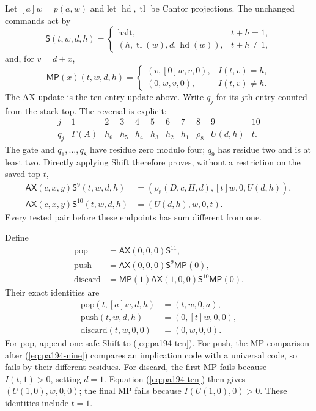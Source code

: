 Let $[a]w=p(a,w)$ and let $\operatorname{hd},\operatorname{tl}$ be
Cantor projections. The unchanged commands act by
\[
 \mathsf S(t,w,d,h)=
 \begin{cases}
   \text{halt},&t+h=1,\\
   (h,\operatorname{tl}(w),d,\operatorname{hd}(w)),&t+h\ne1,
 \end{cases}
\]
and, for $v=d+x$,
\[
 \mathsf{MP}(x)(t,w,d,h)=
 \begin{cases}
   (v,[0]w,v,0),&I(t,v)=h,\\
   (0,w,v,0),&I(t,v)\ne h.
 \end{cases}
\]
The AX update is the ten-entry update above. Write $q_j$ for its
$j$th entry counted from the stack top. The reversal is explicit:
\[
\begin{array}{c|cccccccccc}
 j&1&2&3&4&5&6&7&8&9&10\\ \hline
 q_j&\Gamma(A)&h_6&h_5&h_4&h_3&h_2&h_1&\rho_8&U(d,h)&t.
\end{array}
\]
The gate and $q_1,\ldots,q_8$ have residue zero modulo four;
$q_9$ has residue two and is at least two. Directly applying Shift
therefore proves, without a restriction on the saved top $t$,
\begin{align}
 \mathsf{AX}(c,x,y)\mathsf S^9(t,w,d,h)
   &=(\rho_8(D,c,H,d),[t]w,0,U(d,h)),\label{eq:pa194-nine}\\
 \mathsf{AX}(c,x,y)\mathsf S^{10}(t,w,d,h)
   &=(U(d,h),w,0,t).\label{eq:pa194-ten}
\end{align}
Every tested pair before these endpoints has sum different from one.

Define
\begin{align*}
 \mathrm{pop}&=\mathsf{AX}(0,0,0)\mathsf S^{11},\\
 \mathrm{push}&=\mathsf{AX}(0,0,0)\mathsf S^9\mathsf{MP}(0),\\
 \mathrm{discard}&=\mathsf{MP}(1)\mathsf{AX}(1,0,0)
                                      \mathsf S^{10}\mathsf{MP}(0).
\end{align*}
Their exact identities are
\begin{align*}
 \mathrm{pop}(t,[a]w,d,h)&=(t,w,0,a),\\
 \mathrm{push}(t,w,d,h)&=(0,[t]w,0,0),\\
 \mathrm{discard}(t,w,0,0)&=(0,w,0,0).
\end{align*}
For pop, append one safe Shift to (\ref{eq:pa194-ten}). For push,
the MP comparison after (\ref{eq:pa194-nine}) compares an implication
code with a universal code, so fails by their different residues.
For discard, the first MP fails because $I(t,1)>0$, setting $d=1$.
Equation (\ref{eq:pa194-ten}) then gives $(U(1,0),w,0,0)$;
the final MP fails because $I(U(1,0),0)>0$.
These identities include $t=1$.

